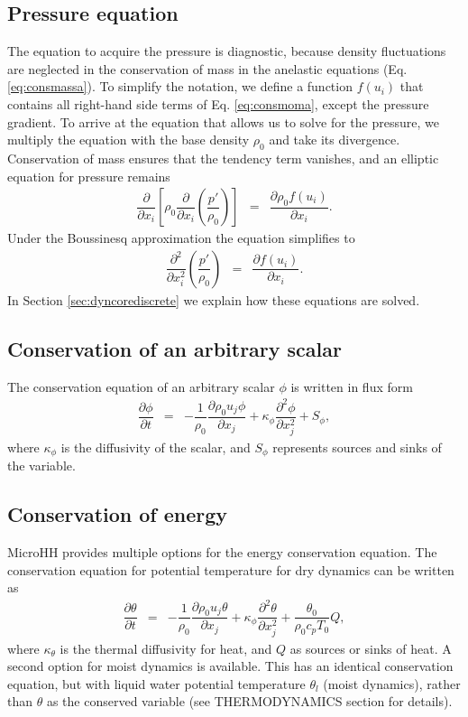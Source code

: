 \documentclass[gmd]{copernicus}
\begin{document}
\subsection{Pressure equation}
The equation to acquire the pressure is diagnostic, because density fluctuations are neglected in the conservation of mass in the anelastic equations (Eq. \ref{eq:consmassa}). To simplify the notation, we define a function $f \left( u_i \right)$ that contains all right-hand side terms of Eq. \ref{eq:consmoma}, except the pressure gradient. To arrive at the equation that allows us to solve for the pressure, we multiply the equation with the base density $\rho_0$ and take its divergence. Conservation of mass ensures that the tendency term vanishes, and an elliptic equation for pressure remains
\begin{eqnarray}
\dfrac{\partial}{\partial x_i} 
\left[ \rho_0 \dfrac{\partial}{\partial x_i} \left( \dfrac{p'}{\rho_0} \right) \right] & = &
\dfrac{\partial \rho_0 f \left( u_i \right)}{\partial x_i}.\label{eq:presa}
\end{eqnarray}
Under the Boussinesq approximation the equation simplifies to
\begin{eqnarray}
\dfrac{\partial^2}{\partial x_i^2} \left( \dfrac{p'}{\rho_0} \right) & = &
\dfrac{\partial f \left( u_i \right)}{\partial x_i}.\label{eq:presb}
\end{eqnarray}
In Section \ref{sec:dyncorediscrete} we explain how these equations are solved.

\subsection{Conservation of an arbitrary scalar}
The conservation equation of an arbitrary scalar $\phi$ is written in flux form
\begin{eqnarray}
\dfrac{\partial \phi}{\partial t} & = & - \dfrac{1}{\rho_0} \dfrac{\partial \rho_0 u_j \phi}{\partial x_j} +
\kappa_\phi \dfrac{\partial^2 \phi}{\partial x_j^2} + S_\phi, \label{eq:consscal}
\end{eqnarray}
where $\kappa_\phi$ is the diffusivity of the scalar, and $S_\phi$ represents sources and sinks of the variable.

\subsection{Conservation of energy}\label{sec:dyncore_energy}
MicroHH provides multiple options for the energy conservation equation. The conservation equation for  potential temperature for dry dynamics can be written as
\begin{eqnarray}
\dfrac{\partial \theta}{\partial t} & = & - \dfrac{1}{\rho_0} \dfrac{\partial \rho_0 u_j \theta}{\partial x_j} + \kappa_\phi \dfrac{\partial^2 \theta}{\partial x_j^2} + \dfrac{\theta_0}{\rho_0 c_p T_0} Q,
\end{eqnarray}
where $\kappa_\theta$ is the thermal diffusivity for heat, and $Q$ as sources or sinks of heat. A second option for moist dynamics is available. This has an identical conservation equation, but with liquid water potential temperature $\theta_l$ (moist dynamics), rather than $\theta$ as the conserved variable (see THERMODYNAMICS section for details).
\end{document}
